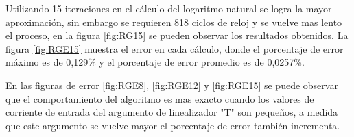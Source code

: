 Utilizando 15 iteraciones en el cálculo del logaritmo natural se logra la mayor aproximación, sin embargo se requieren 818 ciclos de reloj y se vuelve mas lento el proceso, en la figura \ref{fig:RG15} se pueden observar los resultados obtenidos. La figura \ref{fig:RGE15} muestra el error en cada cálculo, donde el porcentaje de error máximo es de  0,129\% y el porcentaje de error promedio es de 0,0257\%. 


En las figuras de error \ref{fig:RGE8}, \ref{fig:RGE12} y \ref{fig:RGE15} se puede observar que el comportamiento del algoritmo es mas exacto cuando los valores de corriente de entrada del argumento de linealizador "T" son pequeños, a medida que este argumento se vuelve mayor el porcentaje de error también incrementa. 